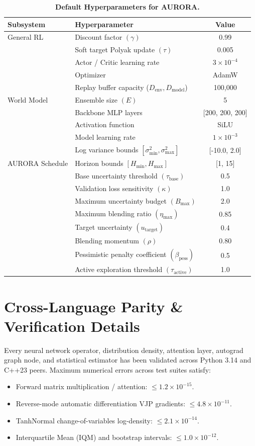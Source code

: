 \documentclass[11pt,a4paper]{article}
\theoremstyle{definition}
\theoremstyle{remark}
\begin{document}
\begin{table}[h]
\centering
\small
\caption{\textbf{Default Hyperparameters for AURORA.}}
\label{tab:hyperparameters}
\begin{tabular}{llc}
\toprule
\textbf{Subsystem} & \textbf{Hyperparameter} & \textbf{Value} \\
\midrule
General RL & Discount factor $(\gamma)$ & 0.99 \\
& Soft target Polyak update $(\tau)$ & 0.005 \\
& Actor / Critic learning rate & $3 \times 10^{-4}$ \\
& Optimizer & AdamW \\
& Replay buffer capacity ($D_{\text{env}}, D_{\text{model}}$) & 100,000 \\
\midrule
World Model & Ensemble size $(E)$ & 5 \\
& Backbone MLP layers & [200, 200, 200] \\
& Activation function & SiLU \\
& Model learning rate & $1 \times 10^{-3}$ \\
& Log variance bounds $[\sigma_{\min}^2, \sigma_{\max}^2]$ & [-10.0, 2.0] \\
\midrule
AURORA Schedule & Horizon bounds $[H_{\min}, H_{\max}]$ & [1, 15] \\
& Base uncertainty threshold $(\tau_{\text{base}})$ & 0.5 \\
& Validation loss sensitivity $(\kappa)$ & 1.0 \\
& Maximum uncertainty budget $(B_{\max})$ & 2.0 \\
& Maximum blending ratio $(\eta_{\max})$ & 0.85 \\
& Target uncertainty $(u_{\text{target}})$ & 0.4 \\
& Blending momentum $(\rho)$ & 0.80 \\
& Pessimistic penalty coefficient $(\beta_{\text{pess}})$ & 0.5 \\
& Active exploration threshold $(\tau_{\text{active}})$ & 1.0 \\
\bottomrule
\end{tabular}
\end{table}

\section{Cross-Language Parity & Verification Details}
\label{app:parity}

Every neural network operator, distribution density, attention layer, autograd graph node, and statistical estimator has been validated across Python 3.14 and C++23 peers. Maximum numerical errors across test suites satisfy:
\begin{itemize}
    \item Forward matrix multiplication / attention: $\le 1.2 \times 10^{-15}$.
    \item Reverse-mode automatic differentiation VJP gradients: $\le 4.8 \times 10^{-11}$.
    \item TanhNormal change-of-variables log-density: $\le 2.1 \times 10^{-14}$.
    \item Interquartile Mean (IQM) and bootstrap intervals: $\le 1.0 \times 10^{-12}$.
\end{itemize}
\end{document}
